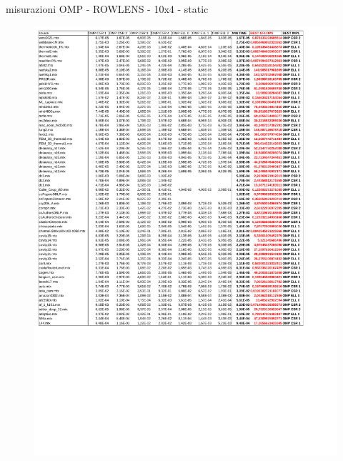 \documentclass[aspectratio=1610]{beamer}
\begin{document}
\begin{frame}[t]{misurazioni OMP -  ROWLENS -  10x4 -  static}
	\begin{figure}[h!]  \centering
        \includegraphics[scale=0.27]{ompNew_10x4_RL_NOSIMD_ImplConfrontoOut.pdf}
    \end{figure}
\end{frame}
\end{document}
